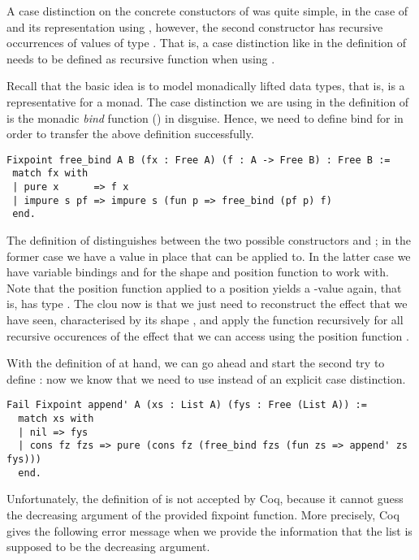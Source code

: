 A case distinction on the concrete constuctors of  was
quite simple, in the case of  and its representation using
, however, the second constructor  has
recursive occurrences of values of type .
That is, a case distinction like in the definition of 
needs to be defined as recursive function when using .

Recall that the basic idea is to model monadically lifted data types,
that is,  is a representative for a monad.
The case distinction we are using in the definition of  is
the monadic \emph{bind} function (\cinl{(>>=)}) in disguise.
Hence, we need to define bind for  in order to transfer the
above definition successfully.

\begin{verbatim}
Fixpoint free_bind A B (fx : Free A) (f : A -> Free B) : Free B :=
 match fx with
 | pure x      => f x
 | impure s pf => impure s (fun p => free_bind (pf p) f)
 end.
\end{verbatim}

The definition of  distinguishes between the two
possible constructors  and ; in the former
case we have a value  in place that  can be applied
to.
In the latter case we have variable bindings  and 
for the shape and position function to work with.
Note that the position function applied to a position
yields a -value again, that is,  has type
.
The clou now is that we just need to reconstruct the effect that we
have seen, characterised by its shape , and apply the function
 recursively for all recursive occurences of the effect that
we can access using the position function .

With the definition of  at hand, we can go ahead and
start the second try to define : now we know that we need
to use  instead of an explicit case distinction.

\begin{verbatim}
Fail Fixpoint append' A (xs : List A) (fys : Free (List A)) :=
  match xs with
  | nil => fys
  | cons fz fzs => pure (cons fz (free_bind fzs (fun zs => append' zs fys)))
  end.
\end{verbatim}

Unfortunately, the definition of  is not accepted by
Coq, because it cannot guess the decreasing argument of the provided
fixpoint function.
More precisely, Coq gives the following error message when we
provide the information that the list  is supposed to be the
decreasing argument.

